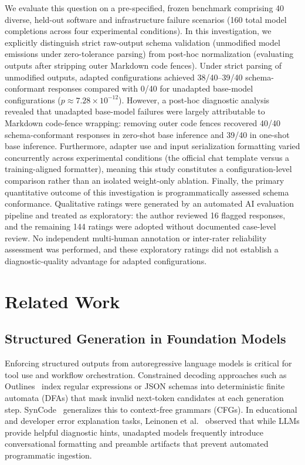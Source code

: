 \documentclass[11pt,a4paper]{article}
\begin{document}
We evaluate this question on a pre-specified, frozen benchmark comprising 40 diverse, held-out software and infrastructure failure scenarios (160 total model completions across four experimental conditions). In this investigation, we explicitly distinguish strict raw-output schema validation (unmodified model emissions under zero-tolerance parsing) from post-hoc normalization (evaluating outputs after stripping outer Markdown code fences). Under strict parsing of unmodified outputs, adapted configurations achieved 38/40--39/40 schema-conformant responses compared with 0/40 for unadapted base-model configurations ($p \approx 7.28 \times 10^{-12}$). However, a post-hoc diagnostic analysis revealed that unadapted base-model failures were largely attributable to Markdown code-fence wrapping: removing outer code fences recovered 40/40 schema-conformant responses in zero-shot base inference and 39/40 in one-shot base inference. Furthermore, adapter use and input serialization formatting varied concurrently across experimental conditions (the official chat template versus a training-aligned formatter), meaning this study constitutes a configuration-level comparison rather than an isolated weight-only ablation. Finally, the primary quantitative outcome of this investigation is programmatically assessed schema conformance. Qualitative ratings were generated by an automated AI evaluation pipeline and treated as exploratory: the author reviewed 16 flagged responses, and the remaining 144 ratings were adopted without documented case-level review. No independent multi-human annotation or inter-rater reliability assessment was performed, and these exploratory ratings did not establish a diagnostic-quality advantage for adapted configurations.

\section{Related Work}

\subsection{Structured Generation in Foundation Models}
Enforcing structured outputs from autoregressive language models is critical for tool use and workflow orchestration. Constrained decoding approaches such as Outlines~\cite{willard2023guided} index regular expressions or JSON schemas into deterministic finite automata (DFAs) that mask invalid next-token candidates at each generation step. SynCode~\cite{ugare2025syncode} generalizes this to context-free grammars (CFGs). In educational and developer error explanation tasks, Leinonen et al.~\cite{leinonen2023error} observed that while LLMs provide helpful diagnostic hints, unadapted models frequently introduce conversational formatting and preamble artifacts that prevent automated programmatic ingestion.
\end{document}
